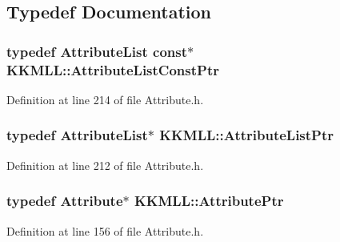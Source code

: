 \subsection{Typedef Documentation}
\subsubsection[{\texorpdfstring{Attribute\+List\+Const\+Ptr}{AttributeListConstPtr}}]{\setlength{\rightskip}{0pt plus 5cm}typedef {\bf Attribute\+List} const$\ast$ {\bf K\+K\+M\+L\+L\+::\+Attribute\+List\+Const\+Ptr}}\hypertarget{namespace_k_k_m_l_l_af9190c2912dde392be82b360d6f82e2d}{}\label{namespace_k_k_m_l_l_af9190c2912dde392be82b360d6f82e2d}


Definition at line 214 of file Attribute.\+h.

\subsubsection[{\texorpdfstring{Attribute\+List\+Ptr}{AttributeListPtr}}]{\setlength{\rightskip}{0pt plus 5cm}typedef {\bf Attribute\+List}$\ast$ {\bf K\+K\+M\+L\+L\+::\+Attribute\+List\+Ptr}}\hypertarget{namespace_k_k_m_l_l_a93de627a8628c403dc343b353b8b4a42}{}\label{namespace_k_k_m_l_l_a93de627a8628c403dc343b353b8b4a42}


Definition at line 212 of file Attribute.\+h.

\subsubsection[{\texorpdfstring{Attribute\+Ptr}{AttributePtr}}]{\setlength{\rightskip}{0pt plus 5cm}typedef {\bf Attribute}$\ast$ {\bf K\+K\+M\+L\+L\+::\+Attribute\+Ptr}}\hypertarget{namespace_k_k_m_l_l_a7bf3ea66cacd9dddc58369800cbc93b6}{}\label{namespace_k_k_m_l_l_a7bf3ea66cacd9dddc58369800cbc93b6}


Definition at line 156 of file Attribute.\+h.

